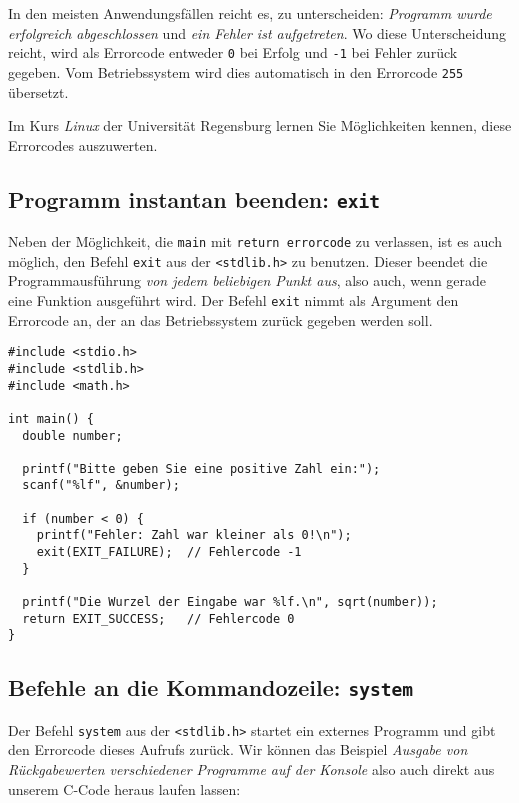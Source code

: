 \begin{hintbox}
In den meisten Anwendungsfällen reicht es, zu unterscheiden: \emph{Programm wurde erfolgreich abgeschlossen} und \emph{ein Fehler ist aufgetreten}. Wo diese Unterscheidung reicht, wird als Errorcode entweder \texttt{0} bei Erfolg und \texttt{-1} bei Fehler zurück gegeben. Vom Betriebssystem wird dies automatisch in den Errorcode \texttt{255} übersetzt.
\end{hintbox}

Im Kurs \emph{Linux} der Universität Regensburg lernen Sie Möglichkeiten kennen, diese Errorcodes auszuwerten.

\subsection{Programm instantan beenden: \texttt{exit}}
Neben der Möglichkeit, die \texttt{main} mit \texttt{return errorcode} zu verlassen, ist es auch möglich, den Befehl \texttt{exit} aus der \texttt{<stdlib.h>} zu benutzen. Dieser beendet die Programmausführung \emph{von jedem beliebigen Punkt aus}, also auch, wenn gerade eine Funktion ausgeführt wird. Der Befehl \texttt{exit} nimmt als Argument den Errorcode an, der an das Betriebssystem zurück gegeben werden soll.

\begin{codebox}
\begin{verbatim}
#include <stdio.h>
#include <stdlib.h>
#include <math.h>

int main() {
  double number;

  printf("Bitte geben Sie eine positive Zahl ein:");
  scanf("%lf", &number);

  if (number < 0) {
    printf("Fehler: Zahl war kleiner als 0!\n");
    exit(EXIT_FAILURE);  // Fehlercode -1
  }

  printf("Die Wurzel der Eingabe war %lf.\n", sqrt(number));
  return EXIT_SUCCESS;   // Fehlercode 0
}
\end{verbatim}
\end{codebox}

\subsection{Befehle an die Kommandozeile: \texttt{system}}
Der Befehl \texttt{system} aus der \texttt{<stdlib.h>} startet ein externes Programm und gibt den Errorcode dieses Aufrufs zurück. Wir können das Beispiel \emph{Ausgabe von Rückgabewerten verschiedener Programme auf der Konsole} also auch direkt aus unserem C-Code heraus laufen lassen:

